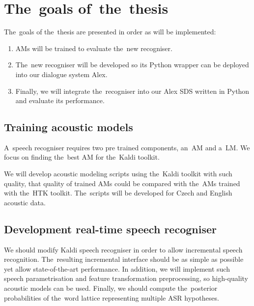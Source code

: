 \section{The~goals of~the~thesis} 
\label{sec:goals}
The~goals of the~thesis are presented in order as will be implemented:
\begin{enumerate}
    \item \acp{AM} will be trained to evaluate the~new recogniser.
    \item The~new recogniser will be developed so its Python wrapper can be deployed into our dialogue system Alex.
    \item Finally, we will integrate the~recogniser into our Alex \ac{SDS} written in Python and evaluate its performance.
\end{enumerate}

\subsection{Training acoustic models} 
\label{sub:training_kaldi_acoustic_models}
A~speech recogniser requires two pre trained components, an~\acl{AM} and a~\acl{LM}. 
We focus on finding the~best \acl{AM} for the~Kaldi toolkit. 

We will develop acoustic modeling scripts using the~Kaldi toolkit\cite{povey2011kaldi} with such quality, that quality of trained \acp{AM} could be compared with the~\acp{AM} trained with the~\ac{HTK} toolkit. 
The~scripts will be developed for Czech and English acoustic data.

\subsection{Development real-time speech recogniser} 
\label{sub:compare_rt}

We should modify Kaldi speech recogniser in order to allow incremental speech recognition.
The~resulting incremental interface should be as simple as possible yet allow state-of-the-art performance.
In addition, we will implement such speech parametrisation and feature transformation preprocessing, so high-quality acoustic models can be used.
Finally, we should compute the~posterior probabilities of the~word lattice representing multiple \ac{ASR} hypotheses.



